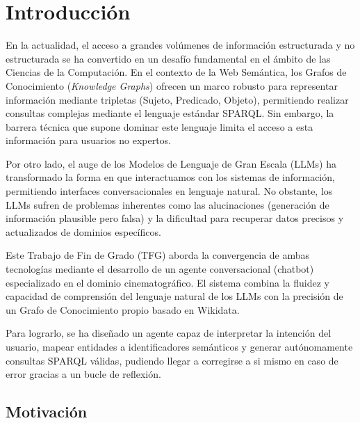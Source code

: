 
\chapter{Introducción}
\label{cap:introduccion}

En la actualidad, el acceso a grandes volúmenes de información estructurada y no estructurada se ha convertido en un desafío fundamental en el ámbito de las Ciencias de la Computación. En el contexto de la Web Semántica, los Grafos de Conocimiento (\textit{Knowledge Graphs}) ofrecen un marco robusto para representar información mediante tripletas (Sujeto, Predicado, Objeto), permitiendo realizar consultas complejas mediante el lenguaje estándar SPARQL. Sin embargo, la barrera técnica que supone dominar este lenguaje limita el acceso a esta información para usuarios no expertos.

Por otro lado, el auge de los Modelos de Lenguaje de Gran Escala (LLMs) ha transformado la forma en que interactuamos con los sistemas de información, permitiendo interfaces conversacionales en lenguaje natural. No obstante, los LLMs sufren de problemas inherentes como las alucinaciones (generación de información plausible pero falsa) y la dificultad para recuperar datos precisos y actualizados de dominios específicos.

Este Trabajo de Fin de Grado (TFG) aborda la convergencia de ambas tecnologías mediante el desarrollo de un agente conversacional (chatbot) especializado en el dominio cinematográfico. El sistema combina la fluidez y capacidad de comprensión del lenguaje natural de los LLMs con la precisión de un Grafo de Conocimiento propio basado en Wikidata. 

Para lograrlo, se ha diseñado un agente capaz de interpretar la intención del usuario, mapear entidades a identificadores semánticos y generar autónomamente consultas SPARQL válidas, pudiendo llegar a corregirse a si mismo en caso de error gracias a un bucle de reflexión.

\section{Motivación}

